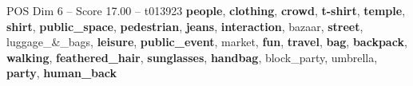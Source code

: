 \begin{textsample}{POS Dim 6 – Score 17.00 – t013923}  \label{ex:f6_pos_015}
\textbf{people}, \textbf{clothing}, \textbf{crowd}, \textbf{t-shirt}, \textbf{temple}, \textbf{shirt}, \textbf{public\_space}, \textbf{pedestrian}, \textbf{jeans}, \textbf{interaction}, bazaar, \textbf{street}, luggage\_\&\_bags, \textbf{leisure}, \textbf{public\_event}, market, \textbf{fun}, \textbf{travel}, \textbf{bag}, \textbf{backpack}, \textbf{walking}, \textbf{feathered\_hair}, \textbf{sunglasses}, \textbf{handbag}, block\_party, umbrella, \textbf{party}, \textbf{human\_back}

\end{textsample}
